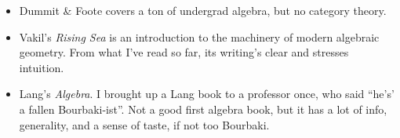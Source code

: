 \documentclass[a5paper]{scrartcl}
\def\book#1{\textit{#1}}
\begin{document}
\begin{itemize}
  \item Dummit \& Foote \cite{dummit+foote} covers a ton of undergrad algebra, but no category theory.

  \item Vakil's \book{Rising Sea} is an introduction to the machinery of modern algebraic geometry. From what I've read so far, its  writing's clear and stresses intuition.

  \item Lang's \book{Algebra}. I brought up a Lang book to a professor once, who said  ``he's' a fallen Bourbaki-ist''. Not a good first algebra book, but it has a lot of info, generality, and a sense of taste, if not too Bourbaki.

\end{itemize}
\printbibliography
\end{document}
